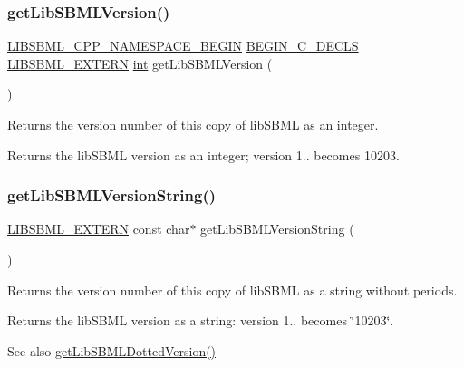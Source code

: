 \subsubsection{\texorpdfstring{get\+Lib\+S\+B\+M\+L\+Version()}{getLibSBMLVersion()}}
{\footnotesize\ttfamily \hyperlink{libsbml-namespace_8h_a41d9f1012efdaa799c31e8e4ddde0fbd}{L\+I\+B\+S\+B\+M\+L\+\_\+\+C\+P\+P\+\_\+\+N\+A\+M\+E\+S\+P\+A\+C\+E\+\_\+\+B\+E\+G\+IN} \hyperlink{libstructural_8h_a004aeed0f22bd5ee77b75a434e2e2a30}{B\+E\+G\+I\+N\+\_\+\+C\+\_\+\+D\+E\+C\+LS} \hyperlink{extern_8h_a8e9e5118f0c55d410f8bc217f2954dbf}{L\+I\+B\+S\+B\+M\+L\+\_\+\+E\+X\+T\+E\+RN} \hyperlink{lp__lib_8h_adeb9ec6400320e4923ac9d836d509ddb}{int} get\+Lib\+S\+B\+M\+L\+Version (\begin{DoxyParamCaption}{ }\end{DoxyParamCaption})}

Returns the version number of this copy of lib\+S\+B\+ML as an integer.

\begin{DoxyReturn}{Returns}
the lib\+S\+B\+ML version as an integer; version 1.. becomes 10203. 
\end{DoxyReturn}
\mbox{\label{libsbml-version_8h_afb7a81ac82570cba7b612c5f0a02c107}} 
\subsubsection{\texorpdfstring{get\+Lib\+S\+B\+M\+L\+Version\+String()}{getLibSBMLVersionString()}}
{\footnotesize\ttfamily \hyperlink{extern_8h_a8e9e5118f0c55d410f8bc217f2954dbf}{L\+I\+B\+S\+B\+M\+L\+\_\+\+E\+X\+T\+E\+RN} const char$\ast$ get\+Lib\+S\+B\+M\+L\+Version\+String (\begin{DoxyParamCaption}{ }\end{DoxyParamCaption})}

Returns the version number of this copy of lib\+S\+B\+ML as a string without periods.

\begin{DoxyReturn}{Returns}
the lib\+S\+B\+ML version as a string\+: version 1.. becomes \char`\"{}10203\char`\"{}.
\end{DoxyReturn}
\begin{DoxySeeAlso}{See also}
\hyperlink{libsbml-version_8h_a3c6ac0bb047165d2c7f26ff94628eb8f}{get\+Lib\+S\+B\+M\+L\+Dotted\+Version()} 
\end{DoxySeeAlso}
\mbox{\label{libsbml-version_8h_a80617f7a0adabd2633507992b265ae6e}} 
